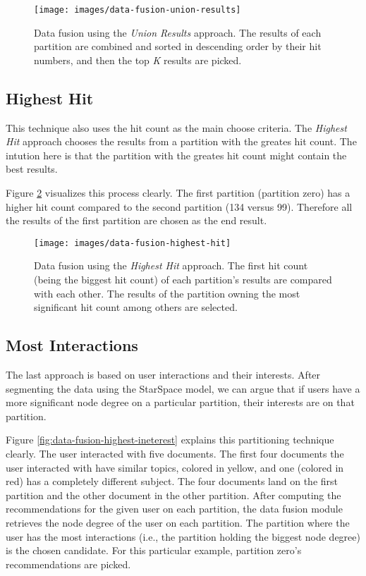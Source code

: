 \begin{figure}[!htb]
    \centering
    \texttt{[image: images/data-fusion-union-results]}
    \caption{Data fusion using the \emph{Union Results} approach. The results of each partition are combined and sorted in descending order by their hit numbers, and then the top \emph{K} results are picked.}
    \label{fig:data-fusion-union-results}
\end{figure}

\subsection{Highest Hit}
\label{subsec:data-fusion-highest-hit}
This technique also uses the hit count as the main choose criteria. The \emph{Highest Hit} approach chooses the results from a partition with the greates hit count. The intution here is that the partition with the greates hit count might contain the best results.


Figure \ref{fig:data-fusion-highest-hit} visualizes this process clearly. The first partition (partition zero) has a higher hit count compared to the second partition (134 versus 99). Therefore all the results of the first partition are chosen as the end result.

\begin{figure}[!htb]
    \centering
    \texttt{[image: images/data-fusion-highest-hit]}
    \caption{Data fusion using the \emph{Highest Hit} approach. The first hit count (being the biggest hit count) of each partition's results are compared with each other. The results of the partition owning the most significant hit count among others are selected.}
    \label{fig:data-fusion-highest-hit}
\end{figure}

\subsection{Most Interactions}
\label{subsec:data-fusion-most-interactions}
The last approach is based on user interactions and their interests. After segmenting the data using the StarSpace model, we can argue that if users have a more significant node degree on a particular partition, their interests are on that partition.


Figure \ref{fig:data-fusion-highest-ineterest} explains this partitioning technique clearly. The user interacted with five documents. The first four documents the user interacted with have similar topics, colored in yellow, and one (colored in red) has a completely different subject. The four documents land on the first partition and the other document in the other partition. After computing the recommendations for the given user on each partition, the data fusion module retrieves the node degree of the user on each partition. The partition where the user has the most interactions (i.e., the partition holding the biggest node degree) is the chosen candidate. For this particular example, partition zero's recommendations are picked.


